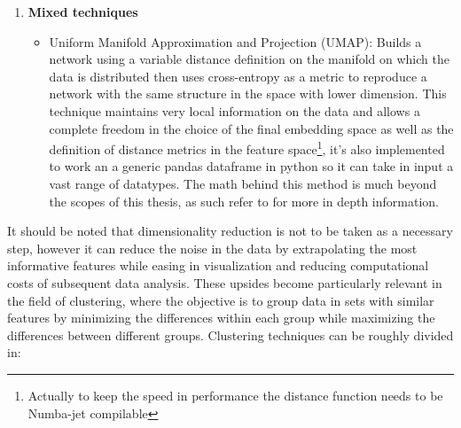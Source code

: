 \begin{enumerate}
\item \textbf{Mixed techniques}
	\begin{itemize}
		\item Uniform Manifold Approximation and Projection (UMAP): Builds a network using a variable distance definition on the manifold on which the data is distributed then uses cross-entropy as a metric to reproduce a network with the same structure in the space with lower dimension. This technique maintains very local information on the data and allows a complete freedom in the choice of the final embedding space as well as the definition of distance metrics in the feature space\footnote{Actually to keep the speed in performance the distance function needs to be Numba-jet compilable}, it's also implemented to work an a generic pandas dataframe in python so it can take in input a vast range of datatypes. The math behind this method is much beyond the scopes of this thesis, as such refer to \cite{UMAP} for more in depth information.
	\end{itemize}
\end{enumerate}

It should be noted that dimensionality reduction is not to be taken as a necessary step, however it can reduce the noise in the data by extrapolating the most informative features while easing in visualization and reducing computational costs of subsequent data analysis. These upsides become particularly relevant in the field of clustering, where the objective is to group data in sets with similar features by minimizing the differences within each group while maximizing the differences between different groups. Clustering techniques can be roughly divided in:

